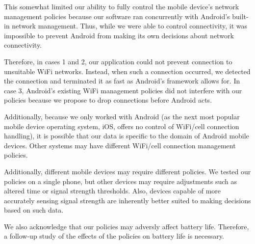 This somewhat limited our ability to fully control the mobile device's network management policies because our software ran concurrently with Android's built-in network management. Thus, while we were able to control connectivity, it was impossible to prevent Android from making its own decisions about network connectivity.

Therefore, in cases 1 and 2, our application could not prevent connection to unsuitable WiFi networks. Instead, when such a connection occurred, we detected the connection and terminated it as fast as Android's framework allows for. In case 3, Android's existing WiFi management policies did not interfere with our policies because we propose to drop connections before Android acts.

Additionally, because we only worked with Android (as the next most popular mobile device operating system, iOS, offers no control of WiFi/cell connection handling), it is possible that our data is specific to the domain of Android mobile devices. Other systems may have different WiFi/cell connection management policies.

Additionally, different mobile devices may require different policies. We tested our policies on a single phone, but other devices may require adjustments such as altered time or signal strength thresholds. Also, devices capable of more accurately sensing signal strength are inherently better suited to making decisions based on such data.

We also acknowledge that our policies may adversly affect battery life. Therefore, a follow-up study of the effects of the policies on battery life is necessary.